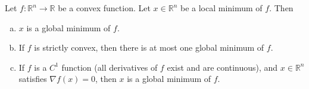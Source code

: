 \begin{theorem}\label{cvx.541a.exercise3.5}
Let $f: \mathbb{R}^{n}\to\mathbb{R}$ be a convex function.  Let $x\in\mathbb{R}^{n}$ be a local minimum of $f$. Then

\begin{enumerate}[(a)]

\item $x$ is a global minimum of $f$.

\item If $f$ is strictly convex, then there is at most one global minimum of $f$.

\item  If $f$ is a $C^{1}$ function (all derivatives of $f$ exist and are continuous), and $x\in\mathbb{R}^{n}$ satisfies $\nabla f(x)=0$, then $x$ is a global minimum of $f$.

\end{enumerate}
\end{theorem}

